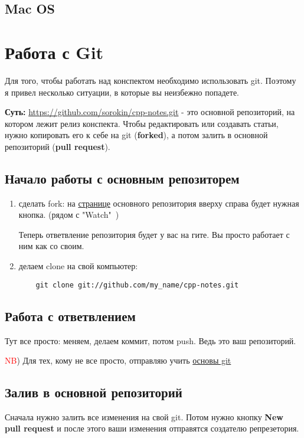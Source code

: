 \documentclass[12pt]{article}
\begin{document}
\subsection{Mac OS}
\section{Работа с Git}
Для того, чтобы работать над конспектом необходимо использовать git. Поэтому я привел несколько ситуации, в которые вы неизбежно попадете.


{\bf Суть:} \url{https://github.com/sorokin/cpp-notes.git} - это основной репозиторий, на котором лежит релиз конспекта. Чтобы редактировать или создавать статьи, нужно копировать его к себе на git ({\bf forked}), а потом залить в основной репозиторий ({\bf pull request}).
	\subsection{Начало работы с основным репозиторем}
	\begin{enumerate}
	\item сделать fork: на \href{https://github.com/sorokin/cpp-notes}{странице} основного репозитория  вверху справа будет нужная кнопка. (рядом с "Watch"\ )


	Теперь ответвление репозитория будет у вас на гите. Вы просто работает с ним как со своим.
	\item делаем clone на свой компьютер:
	\begin{verbatim}
	git clone git://github.com/my_name/cpp-notes.git
	\end{verbatim}
	\end{enumerate}
	\subsection{Работа с ответвлением}
	 Тут все просто: меняем, делаем коммит, потом push. Ведь это ваш репозиторий.


	\textcolor{red}{NB}) Для тех, кому не все просто, отправляю учить \href{https://git-scm.com/book/ru/v1}{основы git}
	\subsection{Залив в основной репозиторий}
	Сначала нужно залить все изменения на свой git. Потом нужно кнопку \textbf{New pull request} и после этого ваши изменения отправятся создателю репрезетория.
\end{document}
